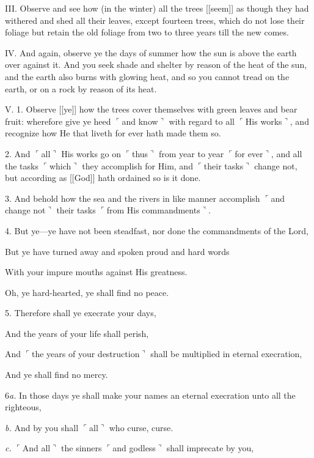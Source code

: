 III. Observe and see how (in the winter) all the
trees [[seem]] as though they had withered and shed
all their leaves, except fourteen trees, which do not
lose their foliage but retain the old foliage from two
to three years till the new comes.

IV. And again, observe ye the days of summer how
the sun is above the earth over against it. And you
seek shade and shelter by reason of the heat of the
sun, and the earth also burns with glowing heat, and
so you cannot tread on the earth, or on a rock by
reason of its heat.

V. 1. Observe [[ye]] how the trees cover themselves
with green leaves and bear fruit: wherefore give ye
heed $\ulcorner$and know$\urcorner$ with regard to all $\ulcorner$His works$\urcorner$,
and recognize how He that liveth for ever hath made
them so.

2. And $\ulcorner$all$\urcorner$ His works go on $\ulcorner$thus$\urcorner$ from year
to year $\ulcorner$for ever$\urcorner$, and all the tasks $\ulcorner$which$\urcorner$ they
accomplish for Him, and $\ulcorner$their tasks$\urcorner$ change not,
but according as [[God]] hath ordained so is it done.

3. And behold how the sea and the rivers in like
manner accomplish $\ulcorner$and change not$\urcorner$ their tasks
$\ulcorner$from His commandments$\urcorner$.

4. But ye—ye have not been steadfast, nor done the commandments of the Lord,

But ye have turned away and spoken proud and hard words

With your impure mouths against His greatness.

Oh, ye hard-hearted, ye shall find no peace.

5. Therefore shall ye execrate your days,

And the years of your life shall perish,

And $\ulcorner$the years of your destruction$\urcorner$ shall be multiplied in eternal execration,

And ye shall find no mercy.

6\emph{a.} In those days ye shall make your names an eternal execration unto all the righteous,

\emph{b.} And by you shall $\ulcorner$all$\urcorner$ who curse, curse.

\emph{c.} $\ulcorner$And all$\urcorner$ the sinners $\ulcorner$and godless$\urcorner$ shall imprecate by you,

